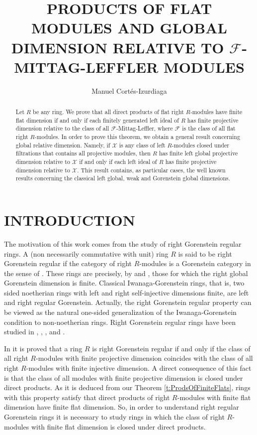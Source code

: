 \documentclass[a4paper,10pt]{amsart}
\title[PRODUCT OF FLATS AND MITTAG-LEFFLER DIMENSION]{PRODUCTS OF FLAT MODULES AND GLOBAL DIMENSION RELATIVE TO
  $\mathcal F$-MITTAG-LEFFLER MODULES}
\author{Manuel Cort\'es-Izurdiaga}
\begin{document}
\maketitle

\begin{abstract}
  Let $R$ be any ring. We prove that all direct products of flat right
  $R$-modules have finite flat dimension if and only if each finitely
  generated left ideal of $R$ has finite projective dimension relative
  to the class of all $\mathcal F$-Mittag-Leffler, where $\mathcal F$
  is the class of all flat right $R$-modules. In order to prove this theorem, we
  obtain a general result concerning global relative
  dimension. Namely, if $\mathcal X$ is any class of left
  $R$-modules closed under filtrations that contains all projective
  modules, then $R$ has finite left global projective dimension
  relative to $\mathcal X$ if and only if each left ideal of $R$ has
  finite projective dimension relative to $\mathcal X$. This result
  contains, as particular cases, the well known results concerning the
  classical left global, weak and Gorenstein global dimensions.
\end{abstract}

\section{INTRODUCTION}
\label{sec:introduction}

The motivation of this work comes from the study of right Gorenstein
regular rings.  A (non necessarily commutative with unit) ring $R$ is
said to be right Gorenstein regular if the category of right $R$-modules
is a Gorenstein category in the sense of \cite[Definition
2.18]{EnochsEstradaGarciaRozas}. These rings are precisely, by
\cite[Theorem 2.28]{EnochsEstradaGarciaRozas} and \cite[Theorem
1.1]{BennisMahdou}, those for which the right global Gorenstein
dimension is finite. Classical Iwanaga-Gorenstein rings, that is, two
sided noetherian rings with left and right self-injective dimensions
finite, are left and right regular Gorenstein. Actually, the right
Gorenstein regular property can be viewed as the natural one-sided
generalization of the Iwanaga-Gorenstein condition to non-noetherian
rings. Right Gorenstein regular rings have been studied in
\cite{EnochsEstradaGarciaRozas}, \cite{BeligiannisReiten},
\cite{EnochsIacobJenda}, \cite{EnochsEstradaIacob} and
\cite{CortesEnochsTorrecillas}.

In \cite[Corollary VII.2.6]{BeligiannisReiten} it is proved that a
ring $R$ is right Gorenstein regular if and only if the class of all
right $R$-modules with finite projective dimension coincides with the
class of all right $R$-modules with finite injective dimension. A direct consequence of this
fact is that the class of all modules with finite projective dimension
is closed under direct products. As it is deduced from our Theorem
\ref{t:ProdsOfFiniteFlats}, rings with this property satisfy that
direct products of right $R$-modules with finite flat dimension have
finite flat dimension. So, in order to understand right regular
Gorenstein rings it is necessary to study rings in which the class of
right $R$-modules with finite flat dimension is closed under direct products.
\end{document}
